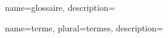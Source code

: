  {
  name={glossaire},
  description={\nopostdesc}
}

 {
  name={terme},
  plural={termes},
  description={\nopostdesc}
}


